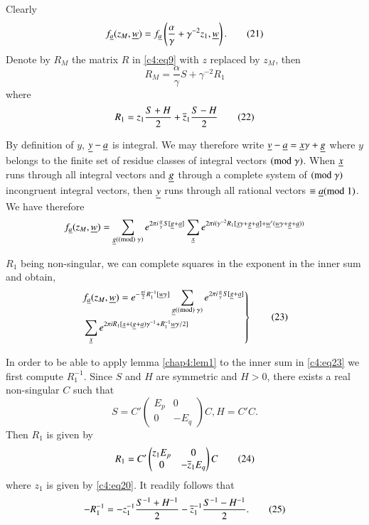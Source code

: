 Clearly\pageoriginale
\begin{equation*}
f_{\underline{a}}(z_{M},\underline{w})=f_{\underline{a}}\left(\frac{\alpha}{\gamma}
+\gamma^{-2}z_{1},\underline{w}\right).\tag{21}\label{c4:eq21} 
\end{equation*}
Denote by $R_{M}$ the matrix $R$ in \eqref{c4:eq9} with $z$ replaced by
$z_{M}$, then 
$$
R_{M}=\frac{\alpha}{\gamma}S+\gamma^{-2}R_{1}
$$
where
\begin{equation*}
R_{1}=z_{1}\frac{S+H}{2}+\overline{z}_{1}\frac{S-H}{2}\tag{22}\label{c4:eq22}
\end{equation*}

By definition of $y$, $\underline{y}-\underline{a}$ is integral. We may
therefore write $\underline{v}-\underline{a}=\underline{x}\gamma +\underline{g}$ where $y$
belongs to the finite set of residue classes of integral vectors
$(\rm{mod} \;\gamma)$. When $\underline{x}$ runs through all integral vectors and
$\underline{g}$ through a complete system of $(\rm{mod} \; \gamma)$ incongruent
integral vectors, then $\underline{y}$ runs through all rational vectors
$\equiv \underline{a}(\rm{mod} \; 1)$. We have therefore
$$
f_{\underline{a}}(z_{M},\underline{w})=\sum_{\underline{g}(\rm(mod) \; \gamma)} e^{2\pi
  i\frac{\alpha}{\gamma}S[\underline{g}+\underline{a}]}\sum_{\underline{x}}e^{2\pi
  i(\gamma^{-2}R_{1}[\underline{x}\gamma+\underline{g}+\underline{a}]+\underline{w}'(\underline{w}\gamma+\underline{g}+\underline{a}))} 
$$

$R_{1}$ being non-singular, we can complete squares in the exponent in
the inner sum and obtain,
\begin{equation*}
\left.
\begin{aligned}
& f_{\underline{a}}(z_{M},\underline{w})=e^{-\frac{\pi
      i}{2}R^{-1}_{1}[\underline{w}\gamma]}\sum_{\underline{g}(\rm(mod) \; \gamma)}e^{2\pi
    i\frac{\alpha}{\gamma}S[\underline{g}+\underline{a}]}\\ 
& \sum_{\underline{x}}e^{2\pi iR_{1}[\underline{x}+(\underline{g}+\underline{a})\gamma^{-1}+R^{-1}_{1}\underline{w}\gamma/2]}
\end{aligned}
\right\}
\tag{23}\label{c4:eq23}
\end{equation*}

In order to be able to apply lemma \ref{chap4:lem1} to the inner sum in
\eqref{c4:eq23} we first compute $R^{-1}_{1}$. Since $S$ and $H$ are
symmetric and $H>0$, there exists a real non-singular $C$ such that 
$$
S=C'
\begin{pmatrix}
E_{p} & 0\\
0 & -E_{q}
\end{pmatrix}C, H=C'C.
$$\pageoriginale
Then $R_{1}$ is given by
\begin{equation*}
R_{1}=C'
\begin{pmatrix}
z_{1}E_{p} & 0\\
0 & -\overline{z}_{1}E_{q}
\end{pmatrix}
C\tag{24}\label{c4:eq24}
\end{equation*}
where $z_{1}$ is given by \eqref{c4:eq20}. It readily follows that
\begin{equation*}
-R^{-1}_{1}=-z^{-1}_{1}\frac{S^{-1}+H^{-1}}{2}-\overline{z}_{1}^{-1}
\frac{S^{-1}-H^{-1}}{2}.\tag{25}\label{c4:eq25}
\end{equation*}

